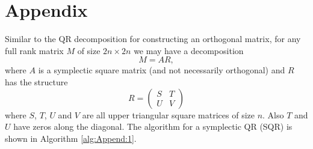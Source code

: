 \section*{Appendix} \label{chap:Append:1}

Similar to the QR decomposition for constructing an orthogonal matrix, for any full rank matrix $M$ of size $2n\times 2n$ we may have a decomposition
\begin{equation}
	M = AR,
\end{equation}
where $A$ is a symplectic square matrix (and not necessarily orthogonal) and $R$ has the structure
\begin{equation}
	R =
	\begin{pmatrix}
		S & T \\
		U & V
	\end{pmatrix}
\end{equation}
where $S$, $T$, $U$ and $V$ are all upper triangular square matrices of size $n$. Also $T$ and $U$ have zeros along the diagonal. The algorithm for a symplectic QR (SQR) is shown in Algorithm \ref{alg:Append:1}.

